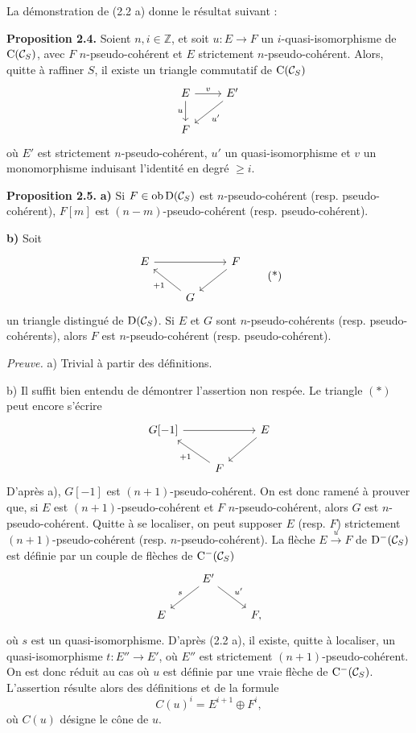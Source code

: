 \documentclass[11pt]{article}
\begin{document}
La démonstration de (2.2 a) donne le résultat suivant :

\textbf{Proposition 2.4.} Soient \(n,i\in\mathbb Z\), et soit \(u:E\to F\) un \(i\)-quasi-isomorphisme de \(\mathrm C(\mathcal C_S)\), avec \(F\) \(n\)-pseudo-cohérent et \(E\) strictement \(n\)-pseudo-cohérent. Alors, quitte à raffiner \(S\), il existe un triangle commutatif de \(\mathrm C(\mathcal C_S)\)
\[
\begin{tikzcd}
E \arrow[r,"v"] \arrow[d,"u"'] & E' \arrow[dl,"u'"]\\
F &
\end{tikzcd}
\]
où \(E'\) est strictement \(n\)-pseudo-cohérent, \(u'\) un quasi-isomorphisme et \(v\) un monomorphisme induisant l'identité en degré \(\geq i\).

\textbf{Proposition 2.5.} \textbf{a)} Si \(F\in\operatorname{ob}\mathrm D(\mathcal C_S)\) est \(n\)-pseudo-cohérent (resp. pseudo-cohérent), \(F[m]\) est \((n-m)\)-pseudo-cohérent (resp. pseudo-cohérent).

\textbf{b)} Soit
\[
\begin{tikzcd}
E \arrow[rr] && F \arrow[dl]\\
& G \arrow[ul,"+1"] &
\end{tikzcd}
\tag{*}
\]
un triangle distingué de \(\mathrm D(\mathcal C_S)\). Si \(E\) et \(G\) sont \(n\)-pseudo-cohérents (resp. pseudo-cohérents), alors \(F\) est \(n\)-pseudo-cohérent (resp. pseudo-cohérent).

\emph{Preuve.} a) Trivial à partir des définitions.

b) Il suffit bien entendu de démontrer l'assertion non respée. Le triangle \((*)\) peut encore s'écrire
\[
\begin{tikzcd}
G[-1] \arrow[rr] && E \arrow[dl]\\
& F \arrow[ul,"+1"] &
\end{tikzcd}
\]
D'après a), \(G[-1]\) est \((n+1)\)-pseudo-cohérent. On est donc ramené à prouver que, si \(E\) est \((n+1)\)-pseudo-cohérent et \(F\) \(n\)-pseudo-cohérent, alors \(G\) est \(n\)-pseudo-cohérent. Quitte à se localiser, on peut supposer \(E\) (resp. \(F\)) strictement \((n+1)\)-pseudo-cohérent (resp. \(n\)-pseudo-cohérent). La flèche \(E\xrightarrow{u}F\) de \(\mathrm D^-(\mathcal C_S)\) est définie par un couple de flèches de \(\mathrm C^-(\mathcal C_S)\)
\[
\begin{tikzcd}
& E' \arrow[dl,"s"'] \arrow[dr,"u'"]\\
E && F ,
\end{tikzcd}
\]
où \(s\) est un quasi-isomorphisme. D'après (2.2 a), il existe, quitte à localiser, un quasi-isomorphisme \(t:E''\to E'\), où \(E''\) est strictement \((n+1)\)-pseudo-cohérent. On est donc réduit au cas où \(u\) est définie par une vraie flèche de \(\mathrm C^-(\mathcal C_S)\). L'assertion résulte alors des définitions et de la formule
\[
  C(u)^i=E^{i+1}\oplus F^i,
\]
où \(C(u)\) désigne le cône de \(u\).
\end{document}

